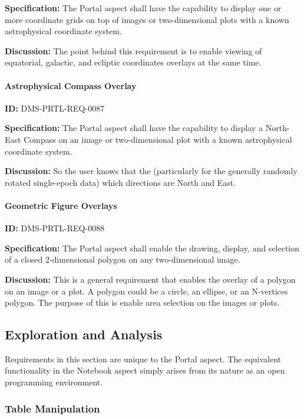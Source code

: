 \documentclass[SE,toc]{lsstdoc}
\begin{document}
\textbf{Specification:}
The Portal aspect shall have the capability to display one or more coordinate grids on top of images or two-dimensional plots with a known astrophysical coordinate system.

\textbf{Discussion:}
The point behind this requirement is to enable viewing of equatorial, galactic, and ecliptic coordinates overlays at the same time.

\paragraph{Astrophysical Compass Overlay}\hfill  %

\label{DMS-PRTL-REQ-0087}
\textbf{ID:} DMS-PRTL-REQ-0087

\textbf{Specification:}
The Portal aspect shall have the capability to display a North-East Compass on an image or two-dimensional plot with a known astrophysical coordinate system.

\textbf{Discussion:}
So the user knows that the (particularly for the generally randomly rotated single-epoch data) which directions are North and East.

\paragraph{Geometric Figure Overlays}\hfill  %

\label{DMS-PRTL-REQ-0088}
\textbf{ID:} DMS-PRTL-REQ-0088

\textbf{Specification:}
The Portal aspect shall enable the drawing, display, and selection of a closed 2-dimensional polygon on any two-dimensional image.

\textbf{Discussion:}
This is a general requirement that enables the overlay of a polygon on an image or a plot.  A polygon could be a circle, an ellipse, or an N-vertices polygon.  The purpose of this is enable area selection on the images or plots.

\subsection{Exploration and Analysis}

Requirements in this section are unique to the Portal aspect.  The equivalent functionality in the Notebook aspect simply arises from its nature as an open programming environment.

\subsubsection{Table Manipulation}
\end{document}

